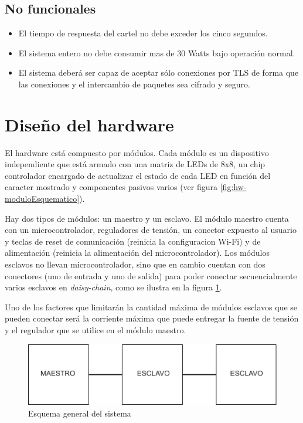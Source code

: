 \subsection{No funcionales}
\begin{itemize}
	\item El tiempo de respuesta del cartel no debe exceder los cinco segundos.
	\item El sistema entero no debe consumir mas de 30 Watts bajo operación normal.
	\item El sistema deberá ser capaz de aceptar sólo conexiones por TLS \cite{TLS} de forma que las conexiones y el intercambio de paquetes sea cifrado y seguro.
\end{itemize}

\section{Diseño del hardware}
El hardware está compuesto por módulos. Cada módulo es un dispositivo independiente que está armado con una matriz de LEDs de 8x8, un chip controlador \cite{MAX7219} encargado de actualizar el estado de cada LED en función del caracter mostrado y componentes pasivos varios (ver figura \ref{fig:hw-moduloEsquematico}). 

Hay dos tipos de módulos: un maestro y un esclavo. El módulo maestro cuenta con un microcontrolador, reguladores de tensión, un conector expuesto al usuario y teclas de reset de comunicación (reinicia la configuracion Wi-Fi) y de alimentación (reinicia la alimentación del microcontrolador). Los módulos esclavos no llevan microcontrolador, sino que en cambio cuentan con dos conectores (uno de entrada y uno de salida) para poder conectar secuencialmente varios esclavos en \emph{daisy-chain}, como se ilustra en la figura \ref{fig:esquema-general}.

Uno de los factores que limitarán la cantidad máxima de módulos esclavos que se pueden conectar será la corriente máxima que puede entregar la fuente de tensión y el regulador que se utilice en el módulo maestro.

\begin{figure}[ht!]
	\begin{center}
		\includegraphics[scale=0.8]{imagenes/hw/esquema-general.pdf}
		\caption{Esquema general del sistema}
		\label{fig:esquema-general}
	\end{center}
\end{figure}

